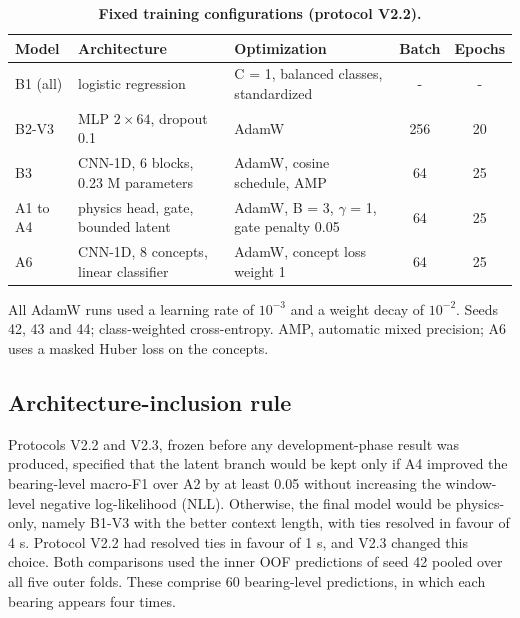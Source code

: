 \documentclass[10pt,letterpaper]{article}
\begin{document}
\begin{table}[!ht]
\centering
\caption{\textbf{Fixed training configurations (protocol V2.2).}}
{\footnotesize
\setlength{\tabcolsep}{4pt}
\renewcommand{\arraystretch}{1.25}
\begin{tabular}{lllcc}
\hline
Model & Architecture & Optimization & Batch & Epochs \\
\hline
B1 (all) & logistic regression & C = 1, balanced classes, standardized & - & - \\
B2-V3 & MLP $2 \times 64$, dropout 0.1 & AdamW & 256 & 20 \\
B3 & CNN-1D, 6 blocks, 0.23 M parameters & AdamW, cosine schedule, AMP & 64 & 25 \\
A1 to A4 & physics head, gate, bounded latent & AdamW, B = 3, $\gamma$ = 1, gate penalty 0.05 & 64 & 25 \\
A6 & CNN-1D, 8 concepts, linear classifier & AdamW, concept loss weight 1 & 64 & 25 \\
\hline
\end{tabular}}
\begin{flushleft} All AdamW runs used a learning rate of $10^{-3}$ and a weight decay of $10^{-2}$. Seeds 42, 43 and 44; class-weighted cross-entropy. AMP, automatic mixed precision; A6 uses a masked Huber loss on the concepts. \end{flushleft}
\label{tab:config}
\end{table}

\subsection*{Architecture-inclusion rule}
Protocols V2.2 and V2.3, frozen before any development-phase result was produced, specified that the latent branch would be kept only if A4 improved the bearing-level macro-F1 over A2 by at least 0.05 without increasing the window-level negative log-likelihood (NLL). Otherwise, the final model would be physics-only, namely B1-V3 with the better context length, with ties resolved in favour of 4 s. Protocol V2.2 had resolved ties in favour of 1 s, and V2.3 changed this choice. Both comparisons used the inner OOF predictions of seed 42 pooled over all five outer folds. These comprise 60 bearing-level predictions, in which each bearing appears four times.
\end{document}
